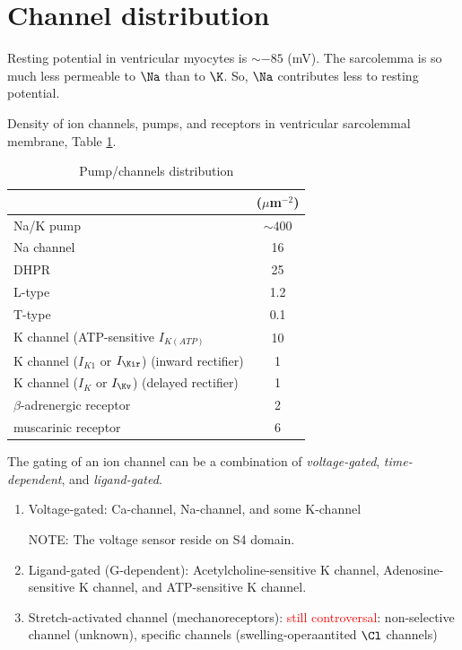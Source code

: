 \section{Channel distribution}
\label{sec:chan_dist}

Resting potential in ventricular myocytes is $\sim -85$ (mV). The sarcolemma is
so much less permeable to $\Na$ than to $\K$. So, $\Na$ contributes less to
resting potential.

Density of ion channels, pumps, and receptors in ventricular sarcolemmal
membrane, Table \ref{tab:pump_chan_distribution}.
\begin{table}[hbt]
\begin{tabular}{lc}
& ($\mu$m$^{-2}$) \\
\hline\hline
Na/K pump	 & $\sim 400$ \\
Na channel & 16 \\
DHPR & 25 \\
L-type & 1.2 \\
T-type & 0.1 \\
K channel (ATP-sensitive $I_{K(ATP)}$ & 10 \\
K channel ($I_{K1}$ or $I_\Kir$) (inward rectifier) & 1 \\
K channel ($I_K$ or $I_\Kv$) (delayed rectifier) & 1 \\
$\beta$-adrenergic receptor & 2 \\
muscarinic receptor & 6 \\
\hline
\end{tabular}
\caption{Pump/channels distribution}
\label{tab:pump_chan_distribution}
\end{table}

The gating of an ion channel can be a combination of {\it voltage-gated}, {\it
time-dependent}, and {\it ligand-gated}.
\begin{enumerate}
  \item Voltage-gated: Ca-channel, Na-channel, and some K-channel

NOTE: The voltage sensor reside on S4 domain.
  \item Ligand-gated (G-dependent): Acetylcholine-sensitive K channel,
  Adenosine-sensitive K channel, and ATP-sensitive K channel.

  \item Stretch-activated channel (mechanoreceptors): \textcolor{red}{still
  controversal}: non-selective channel (unknown), specific channels
  (swelling-operaantited $\Cl$ channels)
\end{enumerate}


